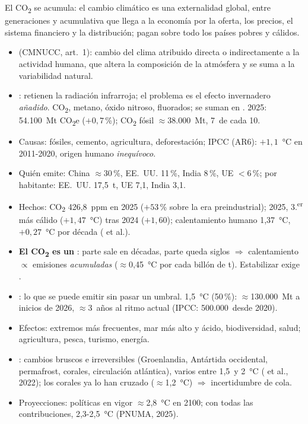 \documentclass{article}
\begin{document}
\begin{columnas}
\begin{ideaclave}
El CO\textsubscript{2} se acumula: el cambio climático es una externalidad global, entre generaciones y acumulativa que llega a la economía por la oferta, los precios, el sistema financiero y la distribución; pagan sobre todo los países pobres y cálidos.
\end{ideaclave}

\begin{itemize}
\item {} (CMNUCC, art.~1): cambio del clima atribuido directa o indirectamente a la actividad humana, que altera la composición de la atmósfera y se suma a la variabilidad natural.
\item {}: retienen la radiación infrarroja; el problema es el efecto invernadero \emph{añadido}. CO\textsubscript{2}, metano, óxido nitroso, fluorados; se suman en . 2025: 54.100~Mt CO\textsubscript{2}e ($+0{,}7$\,\%); CO\textsubscript{2} fósil $\approx$38.000~Mt, 7~de cada 10.
\item Causas: fósiles, cemento, agricultura, deforestación; IPCC (AR6): $+1{,}1$~°C en 2011-2020, origen humano \emph{inequívoco}.
\item Quién emite: China $\approx$30\,\%, EE.~UU. 11\,\%, India 8\,\%, UE $<$6\,\%; por habitante: EE.~UU. 17,5~t, UE 7,1, India 3,1.
\item Hechos: CO\textsubscript{2} 426,8~ppm en 2025 ($+53$\,\% sobre la era preindustrial); 2025, 3.\textsuperscript{er} más cálido ($+1{,}47$~°C) tras 2024 ($+1{,}60$); calentamiento humano 1,37~°C, $+0{,}27$~°C por década ( et al.).
\item \textbf{El CO\textsubscript{2} es un }: parte sale en décadas, parte queda siglos $\Rightarrow$ calentamiento $\propto$ emisiones \emph{acumuladas} ($\approx$0,45~°C por cada billón de t). Estabilizar exige .
\item {}: lo que se puede emitir sin pasar un umbral. 1,5~°C (50\,\%): $\approx$130.000~Mt a inicios de 2026, $\approx$3~años al ritmo actual (IPCC: 500.000~desde 2020).
\item Efectos: extremos más frecuentes, mar más alto y ácido, biodiversidad, salud; agricultura, pesca, turismo, energía.
\item {}: cambios bruscos e irreversibles (Groenlandia, Antártida occidental, permafrost, corales, circulación atlántica), varios entre 1,5~y 2~°C ( et al., 2022); los corales ya lo han cruzado ($\approx$1,2~°C) $\Rightarrow$ incertidumbre de cola.
\item Proyecciones: políticas en vigor $\approx$2,8~°C en 2100; con todas las contribuciones, 2,3-2,5~°C (PNUMA, 2025).
\end{itemize}


\end{columnas}
\end{document}
